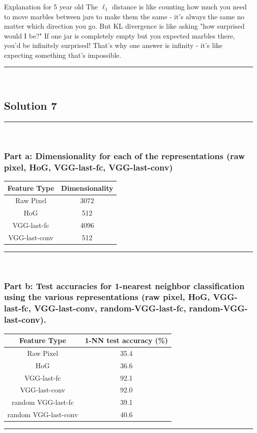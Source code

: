 \documentclass{article}
\begin{document}
\subsubsection*{\normalfont}{Explanation for 5 year old}
The $\ell_1$ distance is like counting how much you need to move marbles between jars to make them the same - it's always the same no matter which direction you go. But KL divergence is like asking "how surprised would I be?" If one jar is completely empty but you expected marbles there, you'd be infinitely surprised! That's why one answer is infinity - it's like expecting something that's impossible.

\noindent\rule{\textwidth}{0.4pt}\\

\newpage
\subsection*{Solution 7}
\noindent\rule{\textwidth}{0.4pt}\\
\subsubsection*{Part a: Dimensionality for each of the representations (raw pixel, HoG, VGG-last-fc, VGG-last-conv)}
\begin{center} 
  \begin{tabular}{|c|c|} 
    \hline Feature Type & Dimensionality \\ 
    \hline 
    Raw Pixel & 3072 \\ 
    HoG & 512  \\
    VGG-last-fc & 4096 \\
    VGG-last-conv & 512 \\ 
    \hline
  \end{tabular}
\end{center}

\noindent\rule{\textwidth}{0.4pt}\\

\subsubsection*{Part b: Test accuracies for 1-nearest neighbor classification using the various representations (raw pixel, HoG, VGG-last-fc, VGG-last-conv, random-VGG-last-fc, random-VGG-last-conv).}
\begin{center} 
  \begin{tabular}{|c|c|} 
    \hline Feature Type & 1-NN test accuracy (\%) \\ 
    \hline 
    Raw Pixel & 35.4 \\ 
    HoG & 36.6  \\
    VGG-last-fc & 92.1 \\
    VGG-last-conv & 92.0 \\
    random VGG-last-fc & 39.1 \\
    random VGG-last-conv & 40.6 \\ 
    \hline
  \end{tabular}
\end{center}
\noindent\rule{\textwidth}{0.4pt}\\
\end{document}
